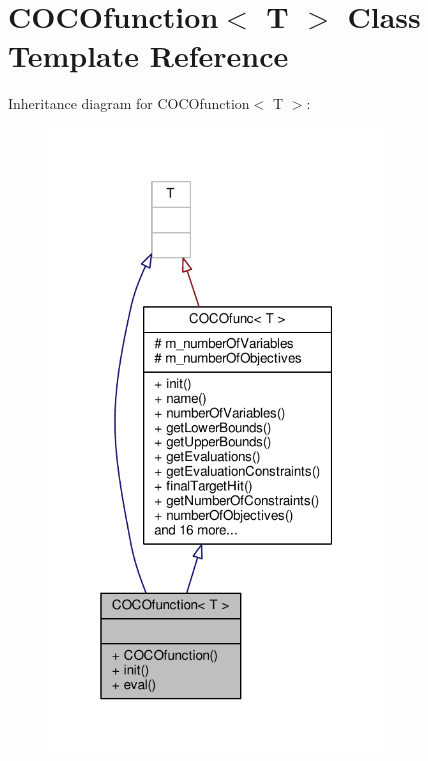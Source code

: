 \hypertarget{classCOCOfunction}{}\section{C\+O\+C\+Ofunction$<$ T $>$ Class Template Reference}
\label{classCOCOfunction}


Inheritance diagram for C\+O\+C\+Ofunction$<$ T $>$\+:
\nopagebreak
\begin{figure}[H]
\begin{center}
\leavevmode
\includegraphics[width=253pt]{classCOCOfunction__inherit__graph}
\end{center}
\end{figure}


